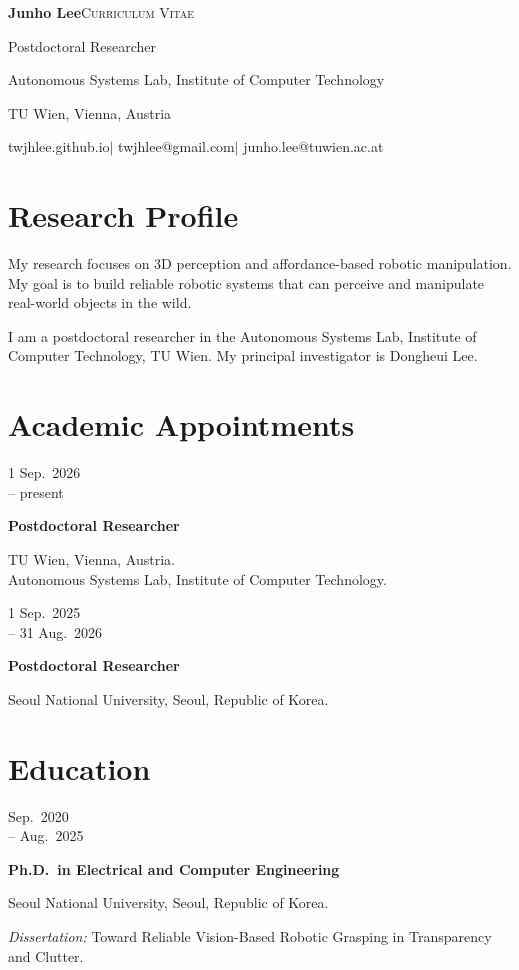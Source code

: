 \documentclass[11pt,a4paper]{article}
\newlength{\datewidth}
\newcommand{\datedentry}[3]{%
  \par\noindent
  \begin{minipage}[t]{\datewidth}
    \raggedright\small #1
  \end{minipage}\hspace{0.15in}%
  \begin{minipage}[t]{\dimexpr\linewidth-\datewidth-0.15in\relax}
    \textbf{#2}\par
    #3
  \end{minipage}\par\vspace{0.5em}}
\begin{document}
\thispagestyle{firstpage}

{\LARGE\bfseries Junho Lee}\hfill{\scshape Curriculum Vitae}\par
\vspace{0.5em}
Postdoctoral Researcher\par
Autonomous Systems Lab, Institute of Computer Technology\par
TU Wien, Vienna, Austria\par
\vspace{0.3em}
{\small
twjhlee.github.io\quad$\vert$\quad
twjhlee@gmail.com\quad$\vert$\quad
junho.lee@tuwien.ac.at}\par

\section{Research Profile}

My research focuses on 3D perception and affordance-based robotic manipulation.
My goal is to build reliable robotic systems that can perceive and manipulate
real-world objects in the wild.

I am a postdoctoral researcher in the
Autonomous Systems Lab,
Institute of Computer Technology,
TU Wien.
My principal investigator is
Dongheui Lee.

\section{Academic Appointments}

\datedentry{1 Sep.\ 2026\\-- present}
{Postdoctoral Researcher}
{TU Wien, Vienna, Austria.\\
Autonomous Systems Lab, Institute of Computer Technology.}

\datedentry{1 Sep.\ 2025\\-- 31 Aug.\ 2026}
{Postdoctoral Researcher}
{Seoul National University, Seoul, Republic of Korea.}

\section{Education}

\datedentry{Sep.\ 2020\\-- Aug.\ 2025}
{Ph.D.\ in Electrical and Computer Engineering}
{Seoul National University, Seoul, Republic of Korea.\par
\textit{Dissertation:} Toward Reliable
Vision-Based Robotic Grasping in Transparency and Clutter.}
\end{document}
